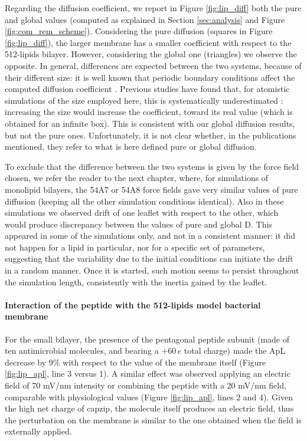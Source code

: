 Regarding the diffusion coefficient, we report in Figure \ref{fig:lip_diff} both the pure and global values (computed as explained in Section \ref{sec:analysis} and Figure \ref{fig:com_rem_scheme}).
%
Considering the pure diffusion (squares in Figure \ref{fig:lip_diff}), the larger membrane has a smaller coefficient with respect to the 512-lipids bilayer. However, considering the global one (triangles) we observe the opposite.
%
In general, differences are expected between the two systems, because of their different size: it is well known that periodic boundary conditions affect the computed diffusion coefficient \citep{Camley2015,Venable2017}. Previous studies have found that, for atomistic simulations of the size employed here, this is systematically underestimated \citep{Camley2015}: increasing the size would increase the coefficient, toward its real value (which is obtained for an infinite box). This is consistent with our global diffusion results, but not the pure ones. Unfortunately, it is not clear whether, in the publications mentioned, they refer to what is here defined pure or global diffusion.

To exclude that the difference between the two systems is given by the force field chosen, we refer the reader to the next chapter, where, for simulations of monolipid bilayers, the 54A7 or 54A8 force fields gave very similar values of pure diffusion (keeping all the other simulation conditions identical).
%
Also in these simulations we observed drift of one leaflet with respect to the other, which would produce discrepancy between the values of pure and global D. This appeared in some of the simulations only, and not in a consistent manner: it did not happen for a lipid in particular, nor for a specific set of parameters, suggesting that the variability due to the initial conditions can initiate the drift in a random manner.
Once it is started, such motion seems to persist throughout the simulation length, consistently with the inertia gained by the leaflet.


\paragraph{Interaction of the peptide with the 512-lipids model bacterial membrane}
For the small bilayer, the presence of the pentagonal peptide subunit (made of ten antimicrobial molecules, and bearing a $+60\,e$ total charge) made the ApL decrease by 9\% with respect to the value of the membrane itself (Figure \ref{fig:lip_apl}, line 3 versus 1).
%
A similar effect was observed applying an electric field of 70 mV/nm intensity or combining the peptide with a 20 mV/nm field, comparable with physiological values (Figure \ref{fig:lip_apl}, lines 2 and 4).
%
Given the high net charge of capzip, the molecule itself produces an electric field, thus the perturbation on the membrane is similar to the one obtained when the field is externally applied.

